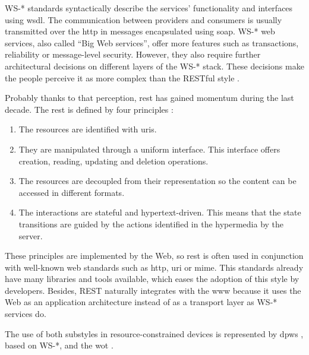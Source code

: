 WS-* standards syntactically describe the services' functionality and interfaces using \ac{wsdl}.
The communication between providers and consumers is usually transmitted over the \ac{http} in messages encapsulated using \ac{soap}.
WS-* web services, also called ``Big Web services'', offer more features such as transactions, reliability or message-level security.
However, they also require further architectural decisions on different layers of the WS-* stack.
These decisions make the people perceive it as more complex than the RESTful style \citep{guinard_search_2011}.


Probably thanks to that perception, \ac{rest} has gained momentum during the last decade. %
The \acl{rest} is defined by four principles \citep{fielding_architectural_2000}:
\begin{enumerate}
  \item The resources are identified with \acp{uri}.
  \item They are manipulated through a uniform interface.
	  This interface offers creation, reading, updating and deletion operations.
  \item The resources are decoupled from their representation so the content can be accessed in different formats.
  \item The interactions are stateful and hypertext-driven.
	This means that the state transitions are guided by the actions identified in the hypermedia by the server.
\end{enumerate}

These principles are implemented by the Web,
so \ac{rest}  is often used in conjunction with well-known web standards such as \ac{http}, \ac{uri} or \ac{mime}.
This standards already have many libraries and tools available, which eases the adoption of this style by developers.
Besides, REST naturally integrates with the \ac{www} because it uses the Web as an application architecture instead of as a transport layer as WS-* services do.

\bigskip


The use of both substyles in resource-constrained devices is represented by
\ac{dpws} \citep{moritz_devices_2010}, based on WS-*,
and the \ac{wot} \citep{guinard_internet_2011}. %


